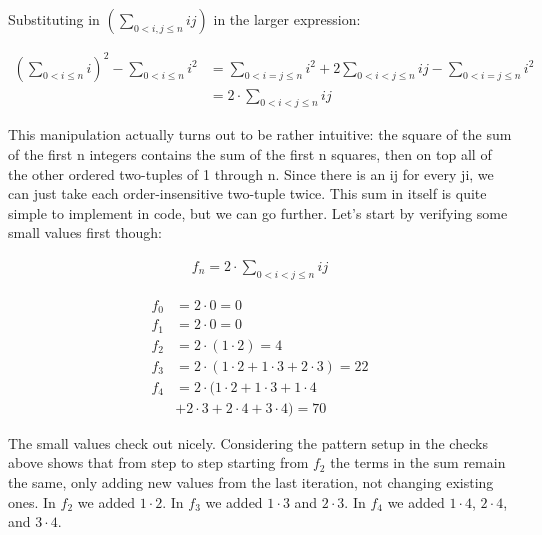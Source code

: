 \documentclass{article}
\begin{document}
Substituting in $\left( \sum_{0 < i, j \le n} i j \right)$
in the larger expression:

\begin{align*}
    \left( \sum_{0 < i \le n} i \right)^2 
    - \sum_{0 < i \le n} i^2 &=
    \sum_{0 < i = j \le n} i^2
    + 2 \sum_{0 < i < j \le n} i j
    - \sum_{0 < i = j \le n} i^2
    \\
    &= 2 \cdot \sum_{0 < i < j \le n} i j
\end{align*}

This manipulation actually turns out to be rather intuitive: the square of
the sum of the first n integers contains the sum of the first n squares,
then on top all of the other ordered two-tuples of 1 through n.  Since
there is an ij for every ji, we can just take each order-insensitive
two-tuple twice.  This sum in itself is quite simple to implement in code,
but we can go further.  Let's start by verifying some small values first though:

\begin{align*}
    f_n = 2 \cdot \sum_{0 < i < j \le n} i j
\end{align*}

\begin{align*}
    f_0 &= 2 \cdot 0 = 0 \\
    f_1 &= 2 \cdot 0 = 0 \\
    f_2 &= 2 \cdot (1 \cdot 2) = 4 \\
    f_3 &= 2 \cdot (1 \cdot 2 + 1 \cdot 3 + 2 \cdot 3) = 22 \\
    f_4 &= 2 \cdot (1 \cdot 2 + 1 \cdot 3 + 1 \cdot 4 \\
    & + 2 \cdot 3 + 2 \cdot 4 + 3 \cdot 4) = 70
\end{align*}

The small values check out nicely.  Considering the pattern setup in the checks
above shows that from step to step starting from $f_2$ the terms in the sum
remain the same, only adding new values from the last iteration, not changing
existing ones.  In $f_2$ we added $1 \cdot 2$.  In $f_3$ we added
$1 \cdot 3$ and $2 \cdot 3$.  In $f_4$ we added $1 \cdot 4$, $2 \cdot 4$,
and $3 \cdot 4$.
\end{document}
